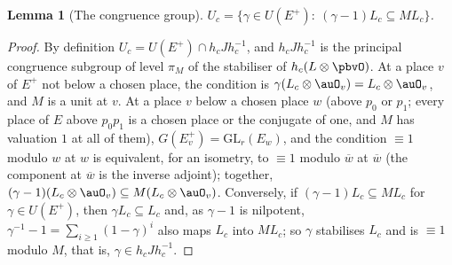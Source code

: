 \documentclass[10pt]{amsart}
\newtheorem{lemma}[theorem]{Lemma}
\theoremstyle{definition}
\theoremstyle{remark}
\providecommand{\auGL}{\mathrm{GL}}
\providecommand{\aubar}[1]{\overline{#1}}
\begin{document}
\begin{lemma}[The congruence group]\label{pbv:Uc}
$U_c=\{\gamma\in U(E^+):\ (\gamma-1)L_c\subseteq M L_c\}$.
\end{lemma}
\begin{proof}
By definition $U_c=U(E^+)\cap h_cJh_c^{-1}$, and $h_cJh_c^{-1}$ is the principal congruence subgroup of
level $\pi_M$ of the stabiliser of $h_c(L\otimes\pbvO)$. At a place $v$ of $E^+$ not below a chosen place,
the condition is $\gamma(L_c\otimes\auO_v)=L_c\otimes\auO_v$, and $M$ is a unit at $v$. At a place $v$ below a
chosen place $w$ (above $p_0$ or $p_1$; every place of $E$ above $p_0p_1$ is a chosen place or the
conjugate of one, and $M$ has valuation $1$ at all of them), $G(E^+_v)=\auGL_r(E_w)$, and the condition
$\equiv1$ modulo $w$ at $w$ is equivalent, for an isometry, to $\equiv1$ modulo $\aubar w$ at $\aubar w$ (the
component at $\aubar w$ is the inverse adjoint); together, $(\gamma-1)(L_c\otimes\auO_v)\subseteq M(L_c
\otimes\auO_v)$. Conversely, if $(\gamma-1)L_c\subseteq ML_c$ for $\gamma\in U(E^+)$, then $\gamma L_c\subseteq L_c$
and, as $\gamma-1$ is nilpotent, $\gamma^{-1}-1=\sum_{i\ge1}(1-\gamma)^i$ also maps $L_c$ into $ML_c$; so
$\gamma$ stabilises $L_c$ and is $\equiv1$ modulo $M$, that is, $\gamma\in h_cJh_c^{-1}$.
\end{proof}
\end{document}
